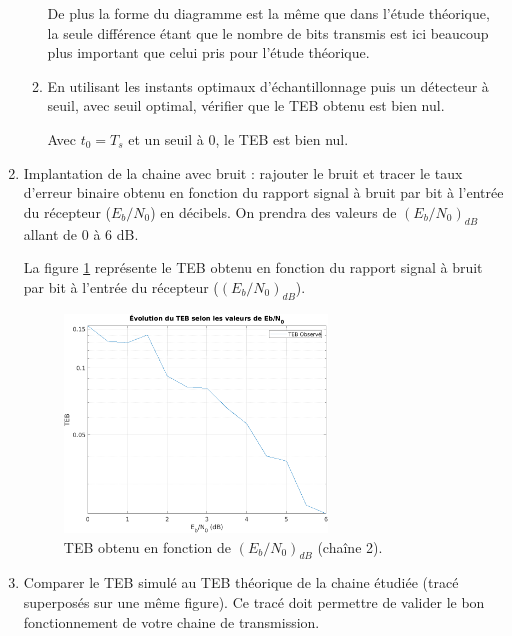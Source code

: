\documentclass[frenchb]{article}
\begin{document}
\begin{enumerate}
\begin{enumerate}
				 De plus la forme du diagramme est la même que dans l'étude théorique, la seule différence étant que le nombre de bits transmis  est ici beaucoup plus important que celui pris pour l'étude théorique. 
                \item En utilisant les instants optimaux d'échantillonnage puis un détecteur à seuil, avec seuil optimal, vérifier que le TEB obtenu est bien nul.
                \par\leavevmode\par
       			 \setlength\parindent{0.5cm}
       			 Avec $t_0 = T_s$ et un seuil à $0$, le TEB est bien nul. 
       		     \par\leavevmode\par
            \end{enumerate}
        \item Implantation de la chaine avec bruit : rajouter le bruit et tracer le taux d'erreur binaire obtenu en fonction du rapport signal à bruit par bit à l'entrée du récepteur ($E_b/N_0$) en décibels. On prendra des valeurs de $\left(E_b/N_0\right)_{dB}$ allant de $0$ à $6$ dB.
        \par\leavevmode\par
       	\setlength\parindent{0.5cm}
       	La figure \ref{fig : C2F6} représente le TEB obtenu en fonction du rapport signal à bruit par bit à l'entrée du récepteur  ($\left(E_b/N_0\right)_{dB}$). 
        
        \begin{figure}[ht!]
		\centering
		\includegraphics[width=7cm]{C2F6.png}		              	    \caption{TEB obtenu en fonction de $\left(E_b/N_0\right)_{dB}$ (chaîne 2). \label{fig : C2F6}}
		\end{figure}
		
		\par\leavevmode\par
        \item Comparer le TEB simulé au TEB théorique de la chaine étudiée (tracé superposés sur une même figure). Ce tracé doit permettre de valider le bon fonctionnement de votre chaine de transmission.
        \par\leavevmode\par
       	

\end{enumerate}
\end{document}
